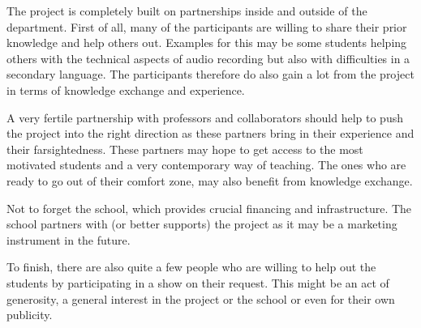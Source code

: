 The project is completely built on partnerships inside and outside of
the department. First of all, many of the participants are willing to
share their prior knowledge and help others out. Examples for this may
be some students helping others with the technical aspects of audio
recording but also with difficulties in a secondary language. The
participants therefore do also gain a lot from the project in terms of
knowledge exchange and experience.

A very fertile partnership with professors and collaborators should help
to push the project into the right direction as these partners bring in
their experience and their farsightedness. These partners may hope to
get access to the most motivated students and a very contemporary way of
teaching. The ones who are ready to go out of their comfort zone, may
also benefit from knowledge exchange.

Not to forget the school, which provides crucial financing and
infrastructure. The school partners with (or better supports) the
project as it may be a marketing instrument in the future.

To finish, there are also quite a few people who are willing to help out
the students by participating in a show on their request. This might be
an act of generosity, a general interest in the project or the school or
even for their own publicity.

